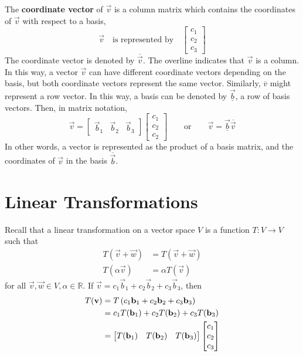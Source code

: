 \documentclass[letterpaper,12pt]{article}
\begin{document}
The \textbf{coordinate vector} of $\vec{v}$ is a column matrix which contains the coordinates of $\vec{v}$ with respect to a basis,
\begin{equation*}
    \vec{v} \quad \text{is represented by} \quad \begin{bmatrix} c_1 \\ c_2 \\ c_3 \end{bmatrix}
\end{equation*}
The coordinate vector is denoted by $\overline{\vec{v}}$. The overline indicates that $\vec{v}$ is a column. In this way, a vector $\vec{v}$ can have different coordinate vectors depending on the basis, but both coordinate vectors represent the same vector. Similarly, $\overline{v}$ might represent a row vector. In this way, a basis can be denoted by $\underline{\vec{b}}$, a row of basis vectors. Then, in matrix notation,
\begin{equation*}
    \vec{v} = \begin{bmatrix} \vec{b}_1 & \vec{b}_2 & \vec{b}_3 \end{bmatrix} \begin{bmatrix} c_1 \\ c_2 \\ c_2 \end{bmatrix} \qquad \text{or} \qquad \vec{v} = \underline{\vec{b}} \overline{\vec{v}}
\end{equation*}
In other words, a vector is represented as the product of a basis matrix, and the coordinates of $\vec{v}$ in the basis $\overline{\vec{b}}$.

\section*{Linear Transformations}
Recall that a linear transformation on a vector space $V$ is a function $T: V \rightarrow V$ such that
\begin{align*}
    T(\vec{v} + \vec{w}) & = T(\vec{v} + \vec{w}) \\
    T(\alpha \vec{v}) & = \alpha T(\vec{v})
\end{align*}
for all $\vec{v}, \vec{w} \in V, \alpha \in \mathbb{R}$. If $\vec{v} = c_1 \vec{b}_1 + c_2 \vec{b}_2 + c_3 \vec{b}_3$, then
\begin{align*}
    T(\mathbf{v}) & = T\left( c_1 \mathbf{b}_1 + c_2 \mathbf{b}_2 + c_3 \mathbf{b}_3 \right) \\
    & = c_1 T(\mathbf{b}_1) + c_2 T(\mathbf{b}_2) + c_3 T(\mathbf{b}_3) \\
    & = \begin{bmatrix} T(\mathbf{b}_1) & T(\mathbf{b}_2) & T(\mathbf{b}_3) \end{bmatrix} \begin{bmatrix} c_1 \\ c_2 \\ c_3 \end{bmatrix}
\end{align*}
\end{document}
